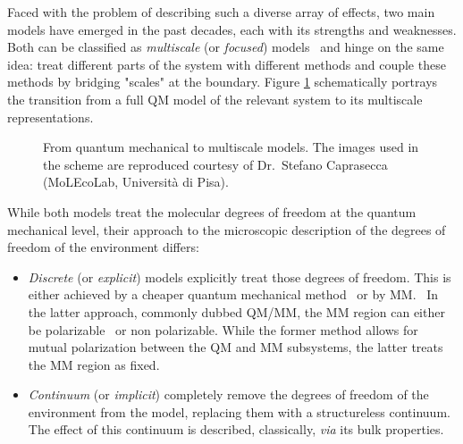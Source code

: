 Faced with the problem of describing such a diverse array of effects,
two main models have emerged in the past decades, each with its
strengths and weaknesses.
Both can be classified as \emph{multiscale} (or \emph{focused})
models~\autocite{Nobel2013} and hinge on the same idea: treat different
parts of the system with different methods and couple these methods by
bridging "scales" at the boundary.
Figure \ref{fig:qm-to-multiscale} schematically portrays the transition
from a full \acrshort{QM} model of the relevant system to its multiscale
representations.

\begin{figure}[tb]
\caption[From quantum mechanical to multiscale models]{
From quantum mechanical to multiscale models.
The images used in the scheme are reproduced courtesy of Dr.~Stefano
Caprasecca (MoLEcoLab, Università di Pisa).}
\label{fig:qm-to-multiscale}
\end{figure}

While both models treat the molecular degrees of freedom at the quantum
mechanical level, their approach to the microscopic description of the
degrees of freedom of the environment differs:
\begin{itemize}
 \item
   \emph{Discrete} (or \emph{explicit}) models explicitly treat those
   degrees of freedom.
   This is either achieved by a cheaper quantum mechanical
   method~\autocite{Vreven2006-gx} or by \gls{MM}.~\autocite{Senn2009-sk}
   In the latter approach, commonly dubbed \acrshort{QM}/\acrshort{MM}, the \acrshort{MM}
   region can either be polarizable~\autocite{Mennucci2013-go,
   Olsen2010-wa, Lipparini2011-rd} or non
   polarizable. While the former method allows for mutual polarization
   between the \acrshort*{QM} and \acrshort*{MM} subsystems, the latter
   treats the \acrshort*{MM} region as fixed.
 \item
   \emph{Continuum} (or \emph{implicit}) completely remove the degrees
   of freedom of the environment from the model, replacing them with a
   structureless continuum.
   The effect of this continuum is described, classically, \emph{via}
   its bulk properties.~\autocite{Onsager1936-wf, Miertus1981-mm}
\end{itemize}

